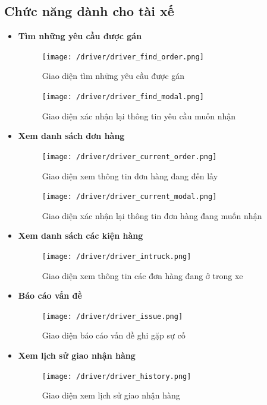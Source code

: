 \subsection{Chức năng dành cho tài xế}
\begin{itemize}
	\item \textbf{Tìm những yêu cầu được gán}
	\begin{figure}[H]
		\texttt{[image: /driver/driver\_find\_order.png]}
		\centering
		\caption{Giao diện tìm những yêu cầu được gán}
	\end{figure}
	
	\begin{figure}[H]
		\texttt{[image: /driver/driver\_find\_modal.png]}
		\centering
		\caption{Giao diện xác nhận lại thông tin yêu cầu muốn nhận}
	\end{figure}
	
	
	\item \textbf{Xem danh sách đơn hàng}
	\begin{figure}[H]
		\texttt{[image: /driver/driver\_current\_order.png]}
		\centering
		\caption{Giao diện xem thông tin đơn hàng đang đến lấy}
	\end{figure}
	
	\begin{figure}[H]
		\texttt{[image: /driver/driver\_current\_modal.png]}
		\centering
		\caption{Giao diện xác nhận lại thông tin đơn hàng đang muốn nhận}
	\end{figure}


	
	\item \textbf{Xem danh sách các kiện hàng}
	\begin{figure}[H]
		\texttt{[image: /driver/driver\_intruck.png]}
		\centering
		\caption{Giao diện xem thông tin các đơn hàng đang ở trong xe}
	\end{figure}
	
	\item \textbf{Báo cáo vấn đề}
	
	\begin{figure}[H]
		\texttt{[image: /driver/driver\_issue.png]}
		\centering
		\caption{Giao diện báo cáo vấn đề ghi gặp sự cố}
	\end{figure}


	\item \textbf{Xem lịch sử giao nhận hàng}
	
	\begin{figure}[H]
		\texttt{[image: /driver/driver\_history.png]}
		\centering
		\caption{Giao diện xem lịch sử giao nhận hàng}
	\end{figure}
	
\end{itemize}

